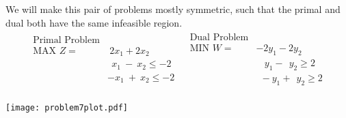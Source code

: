 We will make this pair of problems mostly symmetric, such that the primal and dual both have the same infeasible region.
\begin{equation*}
\begin{array}{ll}
\begin{array}{rl}
\text{Primal Problem} & \\
\text{MAX } Z =&\  2x_1 + 2x_2\\
&\ \ x_1 \ - \ x_2 \leq -2\\
&-x_1 \ + \  x_2 \leq -2
\end{array}
&
\begin{array}{rl}
\text{Dual Problem} & \\
\text{MIN } W =& -2y_1 -2y_2 \\
&\ \ \ \ y_1 - \ \ y_2 \geq 2\\
& \ \  -y_1 + \ \  y_2 \geq 2
\end{array}
\end{array}
\end{equation*}\\
\texttt{[image: problem7plot.pdf]}\\





